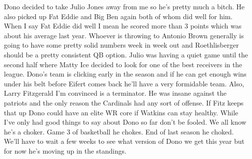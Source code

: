 \documentclass[11pt,letterpaper]{article}
\begin{document}
\par\noindent Dono decided to take Julio Jones away from me so he's pretty much a bitch. He also picked up Fat Eddie and Big Ben again both of whom did well for him. When I say Fat Eddie did well I mean he scored more than 3 points which was about his average last year. Whoever is throwing to Antonio Brown generally is going to have some pretty solid numbers week in week out and Roethlisberger should be a pretty consistent QB option. Julio was having a quiet game until the second half where Matty Ice decided to look for one of the best receivers in the league. Dono's team is clicking early in the season and if he can get enough wins under his belt before Eifert comes back he'll have a very formidable team. Also, Larry Fitzgerald I'm convinced is a terminator. He was insane against the patriots and the only reason the Cardinals had any sort of offense. If Fitz keeps that up Dono could have an elite WR core if Watkins can stay healthy. While I've only had good things to say about Dono so far don't be fooled. We all know he's a choker. Game 3 of basketball he chokes. End of last season he choked. We'll have to wait a few weeks to see what version of Dono we get this year but for now he's moving up in the standings.
\end{document}
